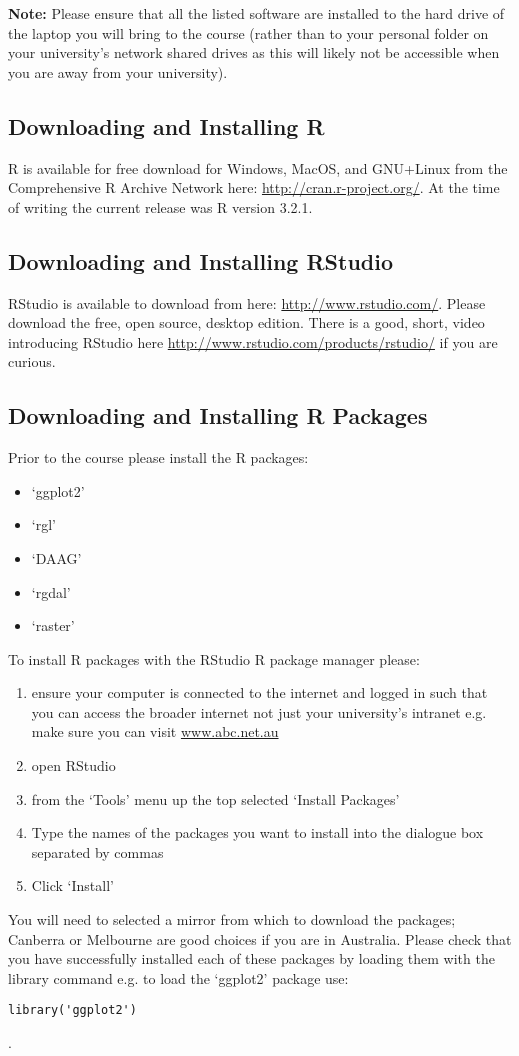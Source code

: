 \documentclass{article}[12pt]
\begin{document}
\textbf{Note:} Please ensure that all the listed software are installed to the hard drive of the laptop you will bring to the course (rather than to your personal folder on your university's network shared drives as this will likely not be accessible when you are away from your university).

\subsection*{Downloading and Installing R}
R is available for free download for Windows, MacOS, and GNU+Linux from the Comprehensive R Archive Network here: \url{http://cran.r-project.org/}.  At the time of writing the current release was R version 3.2.1.

\subsection*{Downloading and Installing RStudio}
RStudio is available to download from here: \url{http://www.rstudio.com/}.
Please download the free, open source, desktop edition.
There is a good, short, video introducing RStudio here \url{http://www.rstudio.com/products/rstudio/} if you are curious.

\subsection*{Downloading and Installing R Packages}
Prior to the course please install the R packages: \begin{itemize}
 \item `ggplot2'
 \item `rgl'
 \item `DAAG'
 \item `rgdal'
 \item `raster'
\end{itemize}

To install R packages with the RStudio R package manager please: \begin{enumerate}
\item ensure your computer is connected to the internet and logged in such that you can access the broader internet not just your university's intranet e.g. make sure you can visit \url{www.abc.net.au}
\item open RStudio
\item from the `Tools' menu up the top selected `Install Packages'
\item Type the names of the packages you want to install into the dialogue box separated by commas
\item Click `Install'
\end{enumerate}
You will need to selected a mirror from which to download the packages; Canberra or Melbourne are good choices if you are in Australia.
Please check that you have successfully installed each of these packages by loading them with the library command e.g. to load the `ggplot2' package use:
\begin{verbatim}
library('ggplot2')
\end{verbatim}.
\end{document}
